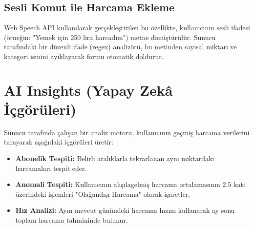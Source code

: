 \subsection{Sesli Komut ile Harcama Ekleme}
Web Speech API kullanılarak gerçekleştirilen bu özellikte, kullanıcının sesli ifadesi (örneğin: "Yemek için 250 lira harcadım") metne dönüştürülür. Sunucu tarafındaki bir düzenli ifade (regex) analizörü, bu metinden sayısal miktarı ve kategori ismini ayıklayarak formu otomatik doldurur.

\section{AI Insights (Yapay Zekâ İçgörüleri)}

Sunucu tarafında çalışan bir analiz motoru, kullanıcının geçmiş harcama verilerini tarayarak aşağıdaki içgörüleri üretir:
\begin{itemize}
    \item \textbf{Abonelik Tespiti:} Belirli aralıklarla tekrarlanan aynı miktardaki harcamaları tespit eder.
    \item \textbf{Anomali Tespiti:} Kullanıcının alışılagelmiş harcama ortalamasının 2.5 katı üzerindeki işlemleri "Olağandışı Harcama" olarak işaretler.
    \item \textbf{Hız Analizi:} Ayın mevcut günündeki harcama hızını kullanarak ay sonu toplam harcama tahmininde bulunur.
\end{itemize}
